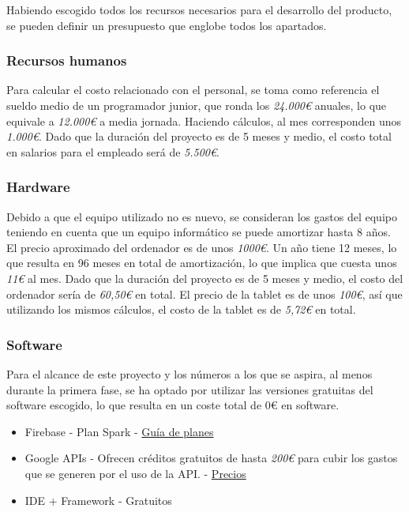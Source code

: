 \documentclass[a4paper, 12pt]{article}
\begin{document}
Habiendo escogido todos los recursos necesarios para el desarrollo del producto, se pueden definir un presupuesto que englobe todos los apartados.

\subsubsection{Recursos humanos}

Para calcular el costo relacionado con el personal, se toma como referencia el sueldo medio de un programador junior, que ronda los \textit{24.000€} anuales, lo que equivale a \textit{12.000€} a media jornada. Haciendo cálculos, al mes corresponden unos \textit{1.000€}. Dado que la duración del proyecto es de 5 meses y medio, el costo total en salarios para el empleado será de \textit{5.500€}.

\subsubsection{Hardware}

Debido a que el equipo utilizado no es nuevo, se consideran los gastos del equipo teniendo en cuenta que un equipo informático se puede amortizar hasta 8 años. El precio aproximado del ordenador es de unos \textit{1000€}. Un año tiene 12 meses, lo que resulta en 96 meses en total de amortización, lo que implica que cuesta unos \textit{11€} al mes. Dado que la duración del proyecto es de 5 meses y medio, el costo del ordenador sería de \textit{60,50€} en total. El precio de la tablet es de unos \textit{100€}, así que utilizando los mismos cálculos, el costo de la tablet es de \textit{5,72€} en total.

\subsubsection{Software}

Para el alcance de este proyecto y los números a los que se aspira, al menos durante la primera fase, se ha optado por utilizar las versiones gratuitas del software escogido, lo que resulta en un coste total de 0€ en software.

\begin{itemize}[noitemsep]
	\item Firebase - Plan Spark - \href{https://firebase.google.com/pricing?hl=es-419}{Guía de planes} \cite{firebase_plans}
	\item Google APIs - Ofrecen créditos gratuitos de hasta \textit{200€} para cubir los gastos que se generen por el uso de la API. - \href{https://mapsplatform.google.com/intl/es/pricing/}{Precios}\cite{google_prices}
	\item IDE + Framework - Gratuitos
\end{itemize}
\end{document}
